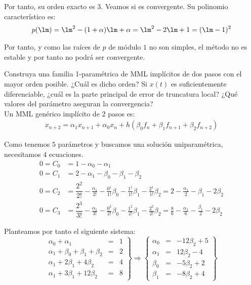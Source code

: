 \begin{ejercicio}
    Por tanto, su orden exacto es $3$. Veamos si es convergente. Su polinomio característico es:
    \begin{align*}
        p(\lm) = \lm^2-(1+\alpha)\lm + \alpha
        = \lm^2-2\lm + 1 = (\lm-1)^2
    \end{align*}

    Por tanto, y como las raíces de $p$ de módulo $1$ no son simples, el método no es estable y por tanto no podrá ser convergente.
\end{ejercicio}

\begin{ejercicio}\label{ej:3.1.13}
    Construya una familia 1-paramétrica de MML implícitos de dos pasos con el mayor orden posible. ¿Cuál es dicho orden? Si $x(t)$ es suficientemente diferenciable, ¿cuál es la parte principal de error de truncatura local? ¿Qué valores del parámetro aseguran la convergencia?\\

    Un MML genérico implícito de 2 pasos es:
    \begin{align*}
        x_{n+2} = \alpha_1x_{n+1} + \alpha_0x_{n} + h\left(\beta_0f_n + \beta_1f_{n+1} + \beta_2f_{n+2}\right)
    \end{align*}

    Como tenemos $5$ parámetros y buscamos una solución uniparamétrica, necesitamos $4$ ecuaciones.
    \begin{align*}
        0 = C_0 &= 1-\alpha_0-\alpha_1\\
        0 = C_1 &= 2-\alpha_1-\beta_0-\beta_1-\beta_2\\
        0 = C_2 &= \dfrac{2^2}{2!} -\frac{\alpha_1}{2!} - \frac{0^1}{1!}\beta_0- \frac{1^1}{1!}\beta_1- \frac{2^1}{1!}\beta_2
        = 2-\frac{\alpha_1}{2}-\beta_1-2\beta_2\\
        0 = C_3 &= \dfrac{2^3}{3!} -\frac{\alpha_1}{3!} - \frac{0^2}{2!}\beta_0- \frac{1^2}{2!}\beta_1- \frac{2^2}{2!}\beta_2
        = \frac{8}{6} - \frac{\alpha_1}{6} - \frac{\beta_1}{2} - 2\beta_2
    \end{align*}

    Planteamos por tanto el siguiente sistema:
    \begin{equation*}
        \left.
            \begin{array}{rcl}
                \alpha_0+\alpha_1 &=& 1\\
                \alpha_1+\beta_0 + \beta_1 + \beta_2 &=& 2\\
                \alpha_1 + 2\beta_1 + 4\beta_2 &=& 4\\
                \alpha_1 + 3\beta_1+12\beta_2 &=& 8
            \end{array}
        \right\}
        \Longrightarrow
        \left\{
            \begin{array}{rcl}
                \alpha_0 &=&-12\beta_2+5\\
                \alpha_1 &=&12\beta_2-4\\
                \beta_0 &=&-5\beta_2+2\\
                \beta_1 &=&-8\beta_2+4
            \end{array}
        \right\}
    \end{equation*}


\end{ejercicio}

